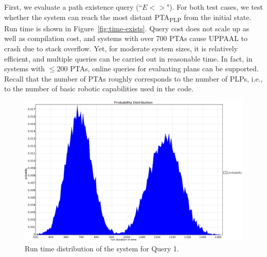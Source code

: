 \documentclass[letterpaper]{article}
\newcommand\rNote[1]{\todo[inline, author=Ronen, color=yellow]{#1}}
\newcommand\aNote[1]{\todo[inline, author=Alex, color=GreenYellow]{#1}}
\begin{document}
First, we evaluate a path existence query (``$E<>$"). 
For both test cases, we test whether the system can reach the most distant PTA\textsubscript{PLP} from the initial state.
%
Run time is
shown in Figure~\ref{fig:time-exists}. %
Query cost does not scale up as well as compilation cost,
and systems with over 700 PTAs cause UPPAAL to crash due to stack overflow. Yet,  for moderate system sizes, it is relatively efficient, and multiple queries can be carried out in reasonable time. In fact, in systems with $\leq  200$ PTAs, online queries for evaluating plans can be supported.
Recall that the number of PTAs roughly corresponds to the number of PLPs,
i.e., to the number of basic robotic capabilities used in the code.



\begin{figure}[htb!]
  \centering
  \includegraphics[width=.66\linewidth]{Q1_1_prob_dist.png}  
  \vspace{-0.08in}
  \caption{Run time distribution of the system for Query 1.}
  \label{fig:robotic-example-query1}
\end{figure}
\end{document}
